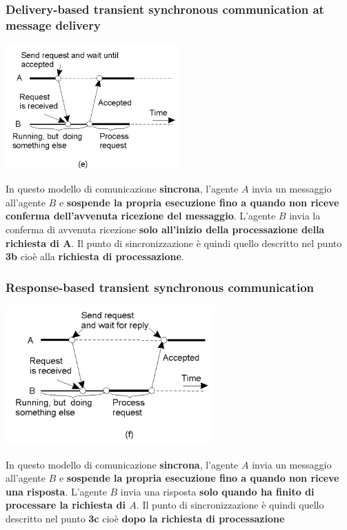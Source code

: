 \documentclass[12pt]{article}
\begin{document}
\subsubsection{Delivery-based transient synchronous communication at message delivery}
\begin{center}
    \includegraphics[width = 0.50\textwidth]{Images/135.PNG}
\end{center}
In questo modello di comunicazione \textbf{sincrona}, l'agente $A$ invia un messaggio all'agente $B$ e \textbf{sospende la propria esecuzione fino a quando non riceve conferma dell'avvenuta ricezione del messaggio}. L'agente $B$ invia la conferma di avvenuta ricezione \textbf{solo all'inizio della processazione della richiesta di $\textbf{A}$}. Il punto di sincronizzazione è quindi quello descritto nel punto \textbf{3b} cioè alla \textbf{richiesta di processazione}.
\subsubsection{Response-based transient synchronous communication}
\begin{center}
    \includegraphics[width = 0.60\textwidth]{Images/136.PNG}
\end{center}
In questo modello di comunicazione \textbf{sincrona}, l'agente $A$ invia un messaggio all'agente $B$ e \textbf{sospende la propria esecuzione fino a quando non riceve una risposta}. L'agente $B$ invia una risposta \textbf{solo quando ha finito di processare la richiesta di $A$}. Il punto di sincronizzazione è quindi quello descritto nel punto \textbf{3c} cioè \textbf{dopo la richiesta di processazione}
\newpage
\end{document}
